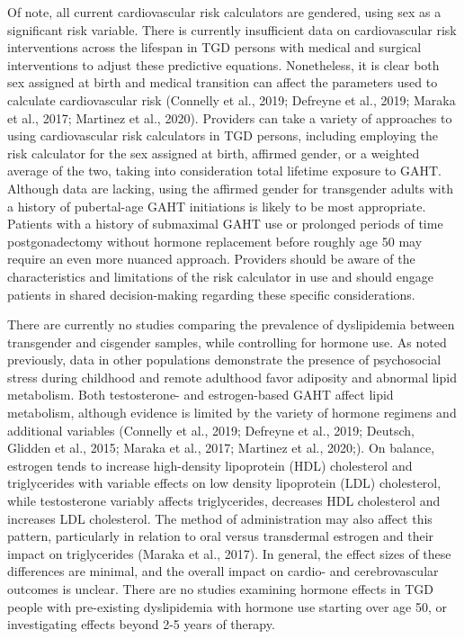 \documentclass[
]{book}
\begin{document}
Of note, all current cardiovascular risk calculators are gendered, using sex as a significant risk
variable. There is currently insufficient data on
cardiovascular risk interventions across the lifespan in TGD persons with medical and surgical
interventions to adjust these predictive equations.
Nonetheless, it is clear both sex assigned at birth
and medical transition can affect the parameters
used to calculate cardiovascular risk (Connelly
et al., 2019; Defreyne et al., 2019; Maraka et al.,
2017; Martinez et al., 2020). Providers can take
a variety of approaches to using cardiovascular
risk calculators in TGD persons, including
employing the risk calculator for the sex assigned
at birth, affirmed gender, or a weighted average
of the two, taking into consideration total lifetime
exposure to GAHT. Although data are lacking,
using the affirmed gender for transgender adults
with a history of pubertal-age GAHT initiations
is likely to be most appropriate. Patients with a
history of submaximal GAHT use or prolonged
periods of time postgonadectomy without hormone replacement before roughly age 50 may
require an even more nuanced approach. Providers
should be aware of the characteristics and limitations of the risk calculator in use and should
engage patients in shared decision-making regarding these specific considerations.

There are currently no studies comparing the
prevalence of dyslipidemia between transgender
and cisgender samples, while controlling for hormone use. As noted previously, data in other
populations demonstrate the presence of psychosocial stress during childhood and remote adulthood favor adiposity and abnormal lipid
metabolism. Both testosterone- and estrogen-based
GAHT affect lipid metabolism, although evidence
is limited by the variety of hormone regimens
and additional variables (Connelly et al., 2019;
Defreyne et al., 2019; Deutsch, Glidden et al.,
2015; Maraka et al., 2017; Martinez et al., 2020;).
On balance, estrogen tends to increase
high-density lipoprotein (HDL) cholesterol and
triglycerides with variable effects on low density
lipoprotein (LDL) cholesterol, while testosterone
variably affects triglycerides, decreases HDL cholesterol and increases LDL cholesterol. The
method of administration may also affect this
pattern, particularly in relation to oral versus
transdermal estrogen and their impact on triglycerides (Maraka et al., 2017). In general, the
effect sizes of these differences are minimal, and
the overall impact on cardio- and cerebrovascular
outcomes is unclear. There are no studies examining hormone effects in TGD people with
pre-existing dyslipidemia with hormone use starting over age 50, or investigating effects beyond
2-5 years of therapy.
\end{document}
